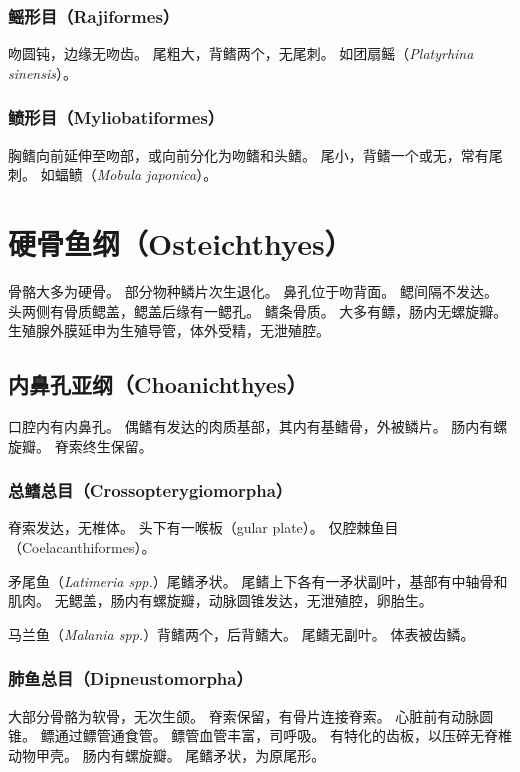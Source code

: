 \documentclass[11pt]{article}
\begin{document}
\subsubsection{鳐形目（Rajiformes）}
吻圆钝，边缘无吻齿。
尾粗大，背鳍两个，无尾刺。
如团扇鳐（\textit{Platyrhina sinensis}）。

\subsubsection{鲼形目（Myliobatiformes）}
胸鳍向前延伸至吻部，或向前分化为吻鳍和头鳍。
尾小，背鳍一个或无，常有尾刺。
如蝠鲼（\textit{Mobula japonica}）。

\section{硬骨鱼纲（Osteichthyes）}
骨骼大多为硬骨。
部分物种鳞片次生退化。
鼻孔位于吻背面。
鳃间隔不发达。
头两侧有骨质鳃盖，鳃盖后缘有一鳃孔。
鳍条骨质。
大多有鳔，肠内无螺旋瓣。
生殖腺外膜延申为生殖导管，体外受精，无泄殖腔。

\subsection{内鼻孔亚纲（Choanichthyes）}
口腔内有内鼻孔。
偶鳍有发达的肉质基部，其内有基鳍骨，外被鳞片。
肠内有螺旋瓣。
脊索终生保留。

\subsubsection{总鳍总目（Crossopterygiomorpha）}
脊索发达，无椎体。
头下有一喉板（gular plate）。
仅腔棘鱼目（Coelacanthiformes）。

\newline

矛尾鱼（\textit{Latimeria spp.}）尾鳍矛状。
尾鳍上下各有一矛状副叶，基部有中轴骨和肌肉。
无鳃盖，肠内有螺旋瓣，动脉圆锥发达，无泄殖腔，卵胎生。

\newline

马兰鱼（\textit{Malania spp.}）背鳍两个，后背鳍大。
尾鳍无副叶。
体表被齿鳞。

\subsubsection{肺鱼总目（Dipneustomorpha）}
大部分骨骼为软骨，无次生颌。
脊索保留，有骨片连接脊索。
心脏前有动脉圆锥。
鳔通过鳔管通食管。
鳔管血管丰富，司呼吸。
有特化的齿板，以压碎无脊椎动物甲壳。
肠内有螺旋瓣。
尾鳍矛状，为原尾形。
\end{document}
